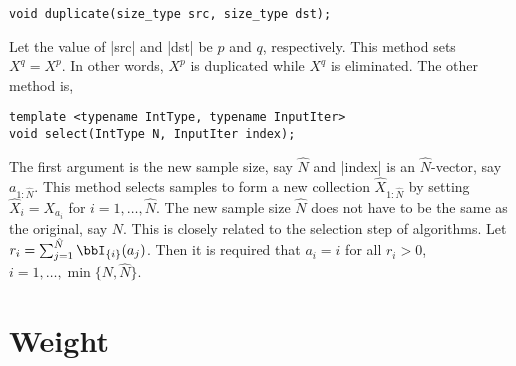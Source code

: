 \begin{verbatim}
void duplicate(size_type src, size_type dst);
\end{verbatim}
Let the value of |src| and |dst| be $p$ and $q$, respectively. This method sets
$X^q = X^p$. In other words, $X^p$ is duplicated while $X^q$ is eliminated. The
other method is,
\begin{verbatim}
template <typename IntType, typename InputIter>
void select(IntType N, InputIter index);
\end{verbatim}
The first argument is the new sample size, say $\hat{N}$ and |index| is an
$\hat{N}$-vector, say $a_{1:\hat{N}}$. This method selects samples to form a
new collection $\hat{X}_{1:\hat{N}}$  by setting $\hat{X}_i = X_{a_i}$ for $i =
1,\dots,\hat{N}$. The new sample size $\hat{N}$ does not have to be the same as
the original, say $N$. This is closely related to the selection step of \smc
algorithms. Let $r_i = \sum_{j = 1}^{\hat{N}}\bbI_{\{i\}}(a_j)$. Then it is
required that $a_i = i$ for all $r_i > 0$, $i = 1,\dots,\min\{N, \hat{N}\}$.

\section{Weight}
\label{sec:Weight}

